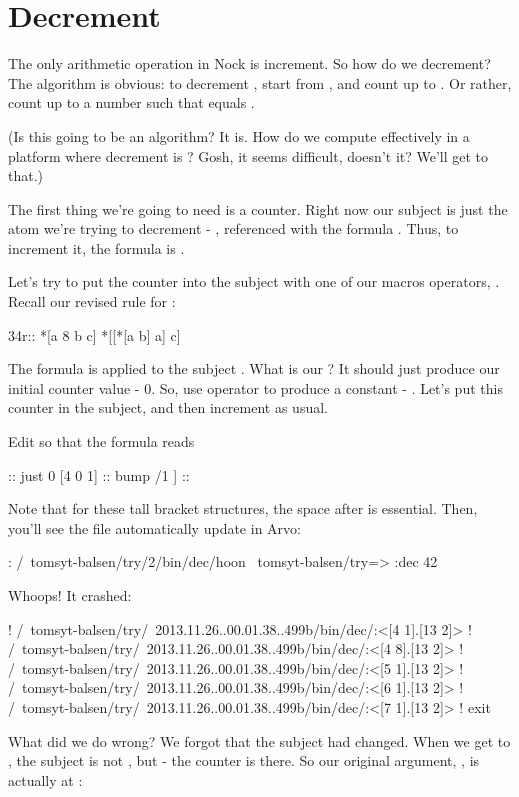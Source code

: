 \section{Decrement}

The only arithmetic operation in Nock is increment.  So how do we
decrement?  The algorithm is obvious: to decrement , start
from , and count up to .  Or rather, count up to a number
 such that  equals .

(Is this going to be an  algorithm?  It is.  How do we
compute effectively in a platform where decrement is ?
Gosh, it seems difficult, doesn't it?  We'll get to that.)

The first thing we're going to need is a counter.  Right now
our subject is just the atom we're trying to decrement - ,
referenced with the formula \kode{[0 1]}.  Thus, to increment it,
the formula is \kode{[4 0 1]}.

Let's try to put the counter into the subject with one of our
macros operators, .  Recall our revised rule for :

\begin{code}
34r::    *[a 8 b c]       *[[*[a b] a] c]
\end{code}
The formula  is applied to the subject \kode{[*[a b] a]}.  What is
our ?  It should just produce our initial counter value - 0.
So, use operator  to produce a constant - \kode{[1 0]}.  Let's
put this counter in the subject, and then increment as usual.

Edit  so that the formula reads

\begin{code}
[ 8                                          ::  push
  [1 0]                                      ::  just 0
  [4 0 1]                                    ::  bump /1
]                                            ::
\end{code}
Note that for these tall bracket structures, the space after \kode{[}
is essential.  Then, you'll see the file automatically update in
Arvo:

\begin{code}
: /~tomsyt-balsen/try/2/bin/dec/hoon
~tomsyt-balsen/try=> :dec 42
\end{code}
Whoops!  It crashed:

\begin{code}
! /~tomsyt-balsen/try/~2013.11.26..00.01.38..499b/bin/dec/:<[4 1].[13 2]>
! /~tomsyt-balsen/try/~2013.11.26..00.01.38..499b/bin/dec/:<[4 8].[13 2]>
! /~tomsyt-balsen/try/~2013.11.26..00.01.38..499b/bin/dec/:<[5 1].[13 2]>
! /~tomsyt-balsen/try/~2013.11.26..00.01.38..499b/bin/dec/:<[6 1].[13 2]>
! /~tomsyt-balsen/try/~2013.11.26..00.01.38..499b/bin/dec/:<[7 1].[13 2]>
! exit
\end{code}
What did we do wrong?  We forgot that the subject had changed.
When we get to \kode{[4 0 1]}, the subject is not , but \kode{[0 42]} -
the counter is there.  So our original argument, , is
actually at :

